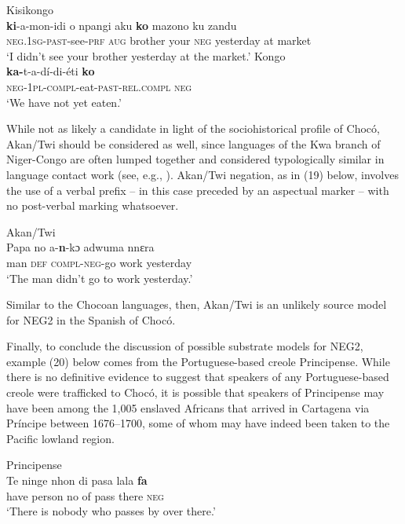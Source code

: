 \documentclass[output=paper,colorlinks,citecolor=brown]{langscibook}
\begin{document}
\ea Kisikongo\\
\gll \textbf{ki}-a-mon-idi o npangi aku \textbf{ko} mazono ku zandu\\
      \textsc{neg}.\textsc{1sg}-\textsc{past}-see-\textsc{prf} \textsc{aug} brother your \textsc{neg} yesterday at market \\
\glt ‘I didn’t see your brother yesterday at the market.’
\ex Kongo \citep[200]{Lumwamu_1973}\\
\gll \textbf{ka-}t-a-dí-di-éti \textbf{ko}\\
     \textsc{neg-1pl-compl}-eat-\textsc{past-rel.compl} \textsc{neg}\\
\glt ‘We have not yet eaten.’ 
\z

While not as likely a candidate in light of the sociohistorical profile of Chocó, Akan/Twi should be considered as well, since languages of the Kwa branch of Niger-Congo are often lumped together and considered typologically similar in language contact work (see, e.g., \cite{Granda_1988}). Akan/Twi negation, as in (19) below, involves the use of a verbal prefix – in this case preceded by an aspectual marker – with no post-verbal marking whatsoever. 

\ea Akan/Twi \citep[104]{Amfo_2010}\\
\gll Papa no a-\textbf{n}-kɔ adwuma nnɛra\\
     man \textsc{def} \textsc{compl-neg}-go work yesterday\\
\glt ‘The man didn’t go to work yesterday.’
\z


Similar to the Chocoan languages, then, Akan/Twi is an unlikely source model for NEG2 in the Spanish of Chocó. 

Finally, to conclude the discussion of possible substrate models for NEG2, example (20) below comes from the Portuguese-based creole Principense. While there is no definitive evidence to suggest that speakers of any Portuguese-based creole were trafficked to Chocó, it is possible that speakers of Principense may have been among the 1,005 enslaved Africans that arrived in Cartagena via Príncipe between 1676--1700, some of whom may have indeed been taken to the Pacific lowland region. 

\ea Principense \citep[58]{Maurer_2009}\\\label{ex:5:21}
\gll Te ninge nhon di pasa lala \textbf{fa}  \\
     have person no of pass there \textsc{neg}  \\
\glt ‘There is nobody who passes by over there.’
\z
\end{document}
